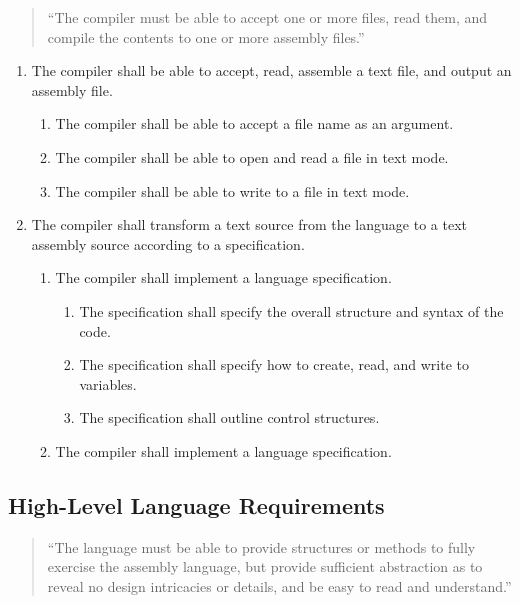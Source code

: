 \documentclass{article}
\begin{document}
\begin{quote}
    ``The compiler must be able to accept one or more files, read them, and compile the contents to one or more assembly files.''
\end{quote}

\begin{enumerate}[label=R\arabic*]
    \item The compiler shall be able to accept, read, assemble a text file, and output an assembly file.
    \begin{enumerate}[label=\theenumi.\arabic*]
        \item The compiler shall be able to accept a file name as an argument.
        \item The compiler shall be able to open and read a file in text mode.
        \item The compiler shall be able to write to a file in text mode.
    \end{enumerate}
    \item The compiler shall transform a text source from the language to a text assembly source according to a specification.
    \begin{enumerate}[label=\theenumi.\arabic*]
        \item The compiler shall implement a language specification.
        \begin{enumerate}[label=\theenumii.\arabic*]
            \item The specification shall specify the overall structure and syntax of the code.
            \item The specification shall specify how to create, read, and write to variables.
            \item The specification shall outline control structures.
        \end{enumerate}
        \item The compiler shall implement a language specification.
    \end{enumerate}
\end{enumerate}

\subsection{High-Level Language Requirements}

\begin{quote}
    ``The language must be able to provide structures or methods to fully exercise the assembly language, but provide sufficient abstraction as to reveal no design intricacies or details, and be easy to read and understand.''
\end{quote}
\end{document}
